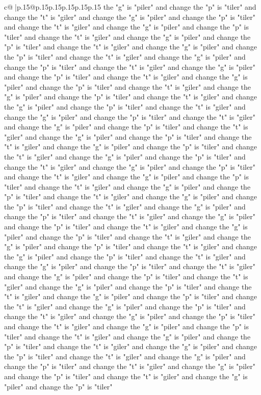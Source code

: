 \documentclass{article}
\begin{document}
{\begin{supertabular}{c@{$\;$}|p{.15\linewidth}@{}p{.15\linewidth}p{.15\linewidth}p{.15\linewidth}p{.15\linewidth}p{.15\linewidth}}
{{{the "g" is "piler" and change the "p" is "tiler" and change the "t" is "giler" and change the "g" is "piler" and change the "p" is "tiler" and change the "t" is "giler" and change the "g" is "piler" and change the "p" is "tiler" and change the "t" is "giler" and change the "g" is "piler" and change the "p" is "tiler" and change the "t" is "giler" and change the "g" is "piler" and change the "p" is "tiler" and change the "t" is "giler" and change the "g" is "piler" and change the "p" is "tiler" and change the "t" is "giler" and change the "g" is "piler" and change the "p" is "tiler" and change the "t" is "giler" and change the "g" is "piler" and change the "p" is "tiler" and change the "t" is "giler" and change the "g" is "piler" and change the "p" is "tiler" and change the "t" is "giler" and change the "g" is "piler" and change the "p" is "tiler" and change the "t" is "giler" and change the "g" is "piler" and change the "p" is "tiler" and change the "t" is "giler" and change the "g" is "piler" and change the "p" is "tiler" and change the "t" is "giler" and change the "g" is "piler" and change the "p" is "tiler" and change the "t" is "giler" and change the "g" is "piler" and change the "p" is "tiler" and change the "t" is "giler" and change the "g" is "piler" and change the "p" is "tiler" and change the "t" is "giler" and change the "g" is "piler" and change the "p" is "tiler" and change the "t" is "giler" and change the "g" is "piler" and change the "p" is "tiler" and change the "t" is "giler" and change the "g" is "piler" and change the "p" is "tiler" and change the "t" is "giler" and change the "g" is "piler" and change the "p" is "tiler" and change the "t" is "giler" and change the "g" is "piler" and change the "p" is "tiler" and change the "t" is "giler" and change the "g" is "piler" and change the "p" is "tiler" and change the "t" is "giler" and change the "g" is "piler" and change the "p" is "tiler" and change the "t" is "giler" and change the "g" is "piler" and change the "p" is "tiler" and change the "t" is "giler" and change the "g" is "piler" and change the "p" is "tiler" and change the "t" is "giler" and change the "g" is "piler" and change the "p" is "tiler" and change the "t" is "giler" and change the "g" is "piler" and change the "p" is "tiler" and change the "t" is "giler" and change the "g" is "piler" and change the "p" is "tiler" and change the "t" is "giler" and change the "g" is "piler" and change the "p" is "tiler" and change the "t" is "giler" and change the "g" is "piler" and change the "p" is "tiler" and change the "t" is "giler" and change the "g" is "piler" and change the "p" is "tiler" and change the "t" is "giler" and change the "g" is "piler" and change the "p" is "tiler" and change the "t" is "giler" and change the "g" is "piler" and change the "p" is "tiler" and change the "t" is "giler" and change the "g" is "piler" and change the "p" is "tiler" and change the "t" is "giler" and change the "g" is "piler" and change the "p" is "tiler" and change the "t" is "giler" and change the "g" is "piler" and change the "p" is "tiler" and change the "t" is "giler" and change the "g" is "piler" and change the "p" is "tiler" }}}
\end{supertabular}}
\end{document}
